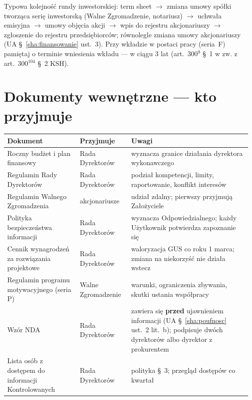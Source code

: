 \documentclass[11pt,a4paper]{report}
\begin{document}
\begin{Komentarz}
Typowa kolejność rundy inwestorskiej: term sheet $\to$ zmiana umowy spółki tworząca serię inwestorską (Walne Zgromadzenie, notariusz) $\to$ uchwała emisyjna $\to$ umowy objęcia akcji $\to$ wpis do rejestru akcjonariuszy $\to$ zgłoszenie do rejestru przedsiębiorców; równolegle zmiana umowy akcjonariuszy (UA §~\ref{sha:finansowanie} ust.~3). Przy wkładzie w postaci pracy (seria~F) pamiętaj o terminie wniesienia wkładu --- w ciągu 3 lat (art.~300$^{9}$ §~1 w zw. z art.~300$^{104}$ §~2 KSH).
\end{Komentarz}

\section{Dokumenty wewnętrzne --- kto przyjmuje}

\begin{tabularx}{\linewidth}{@{}>{\raggedright\arraybackslash}p{4.0cm} >{\raggedright\arraybackslash}p{3.3cm} X@{}}
\toprule
\textbf{Dokument} & \textbf{Przyjmuje} & \textbf{Uwagi} \\
\midrule
Roczny budżet i plan finansowy & Rada Dyrektorów & wyznacza granice działania dyrektora wykonawczego \\
Regulamin Rady Dyrektorów & Rada Dyrektorów & podział kompetencji, limity, raportowanie, konflikt interesów \\
Regulamin Walnego Zgromadzenia & akcjonariusze & udział zdalny; pierwszy przyjmują Założyciele \\
Polityka bezpieczeństwa informacji & Rada Dyrektorów & wyznacza Odpowiedzialnego; każdy Użytkownik potwierdza zapoznanie się \\
Cennik wynagrodzeń za rozwiązania projektowe & Rada Dyrektorów & waloryzacja GUS co roku 1 marca; zmiana na niekorzyść nie działa wstecz \\
Regulamin programu motywacyjnego (seria P) & Walne Zgromadzenie & warunki, ograniczenia zbywania, skutki ustania współpracy \\
Wzór NDA & Rada Dyrektorów & zawiera się \textbf{przed} ujawnieniem informacji (UA §~\ref{sha:poufnosc} ust.~2 lit.~b); podpisuje dwóch dyrektorów albo dyrektor z prokurentem \\
Lista osób z dostępem do informacji Kontrolowanych & Rada Dyrektorów & polityka §~3; przegląd dostępów co kwartał \\
\bottomrule
\end{tabularx}
\end{document}
